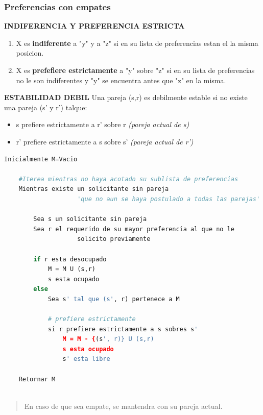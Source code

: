 \documentclass{article}
\begin{document}
\subsubsection{Preferencias con empates}


\textbf{INDIFERENCIA Y PREFERENCIA ESTRICTA}

\begin{enumerate}
    \item X es \textbf{indiferente} a "y" y a "z" si en su lista de preferencias estan el la misma posicion.
    \item X es \textbf{prefefiere estrictamente} a "y" sobre "z" si en su lista de preferencias no le son indiferentes y 
          "y" se encuentra antes que "z" en la misma.
\end{enumerate}

\noindent
\textbf{ESTABILIDAD DEBIL}
\newline Una pareja (s,r) es debilmente estable si no existe una pareja (s' y r') talque:
\begin{itemize}
    \item s prefiere estrictamente a r' sobre r \textit{(pareja actual de s)}
    \item r' prefiere estrictamente a s sobre s' \textit{(pareja actual de r')}
\end{itemize}



\begin{lstlisting}[language=Python, caption=Algoritmo para parejas incompletas]
    Inicialmente M=Vacio
    
    #Iterea mientras no haya acotado su sublista de preferencias
    Mientras existe un solicitante sin pareja
                    'que no aun se haya postulado a todas las parejas' 
    
        Sea s un solicitante sin pareja
        Sea r el requerido de su mayor preferencia al que no le
                    solicito previamente
            
        if r esta desocupado
            M = M U (s,r)
            s esta ocupado
        else
            Sea s' tal que (s', r) pertenece a M

            # prefiere estrictamente
            si r prefiere estrictamente a s sobres s'
                M = M - {(s', r)} U (s,r)
                s esta ocupado
                s' esta libre
    
    Retornar M
    
\end{lstlisting}    
\begin{quote}
    En caso de que sea empate, se mantendra con su pareja actual.
\end{quote}
\end{document}
